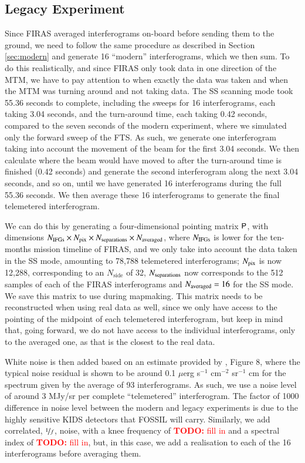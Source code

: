 \documentclass{aa}
\newcommand{\todo}[1]{\textcolor{red}{\textbf{TODO:} #1}}
\newcommand{\matP}[0]{\tens{P}}
\begin{document}
\subsection{Legacy Experiment}
\label{sec:firas-like}

Since FIRAS averaged interferograms on-board before sending them to the ground, we need to follow the same procedure as described in Section \ref{sec:modern} and generate 16 ``modern'' interferograms, which we then sum. To do this realistically, and since FIRAS only took data in one direction of the MTM, we have to pay attention to when exactly the data was taken and when the MTM was turning around and not taking data. The SS scanning mode took 55.36 seconds to complete, including the sweeps for 16 interferograms, each taking 3.04 seconds, and the turn-around time, each taking 0.42 seconds, compared to the seven seconds of the modern experiment, where we simulated only the forward sweep of the FTS. As such, we generate one interferogram taking into account the movement of the beam for the first 3.04 seconds. We then calculate where the beam would have moved to after the turn-around time is finished (0.42 seconds) and generate the second interferogram along the next 3.04 seconds, and so on, until we have generated 16 interferograms during the full 55.36 seconds. We then average these 16 interferograms to generate the final telemetered interferogram.

We can do this by generating a four-dimensional pointing matrix $\matP$, with dimensions $N_{\rm IFGs} \times N_{\rm pix} \times N_{\rm separations} \times N_{\rm averaged}$, where $N_{\rm IFGs}$ is lower for the ten-months mission timeline of FIRAS, and we only take into account the data taken in the SS mode, amounting to 78,788 telemetered interferograms; $N_{\rm pix}$ is now 12,288, corresponding to an $N_\mathrm{side}$ of 32, $N_{\rm separations}$ now corresponds to the 512 samples of each of the FIRAS interferograms and $N_{\rm averaged}=16$ for the SS mode. We save this matrix to use during mapmaking. This matrix needs to be reconstructed when using real data as well, since we only have access to the pointing of the midpoint of each telemetered interferogram, but keep in mind that, going forward, we do not have access to the individual interferograms, only to the averaged one, as that is the closest to the real data.

White noise is then added based on an estimate provided by \cite{fixsen:1994}, Figure 8, where the typical noise residual is shown to be around 0.1 $\mu$erg s$^{-1}$ cm$^{-2}$ sr$^{-1}$ cm for the spectrum given by the average of 93 interferograms. As such, we use a noise level of around 3 MJy/sr per complete ``telemetered'' interferogram. The factor of 1000 difference in noise level between the modern and legacy experiments is due to the highly sensitive KIDS detectors that FOSSIL will carry. Similarly, we add correlated, $\nicefrac{1}{f}$, noise, with a knee frequency of \todo{fill in} and a spectral index of \todo{fill in}, but, in this case, we add a realisation to each of the 16 interferograms before averaging them.
\end{document}
